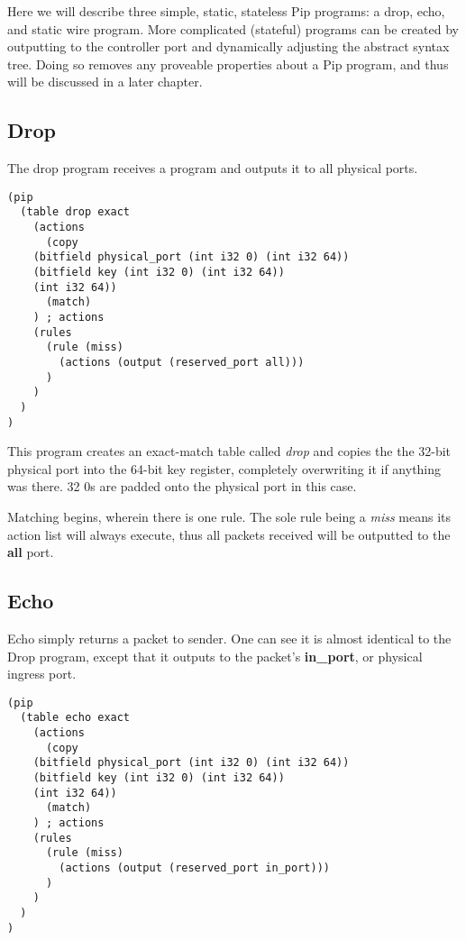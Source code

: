 
Here we will describe three simple, static, stateless Pip programs: a drop, echo, and static wire program. More complicated (stateful) programs can be created by outputting to the controller port and dynamically adjusting the abstract syntax tree. Doing so removes any proveable properties about a Pip program, and thus will be discussed in a later chapter.

\subsection{Drop}
The drop program receives a program and outputs it to all physical ports.
\begin{verbatim}
(pip
  (table drop exact
    (actions
      (copy
	(bitfield physical_port (int i32 0) (int i32 64))
	(bitfield key (int i32 0) (int i32 64))
	(int i32 64))
      (match)
    ) ; actions
    (rules
      (rule (miss)
        (actions (output (reserved_port all)))
      )
    )
  )
)
\end{verbatim}
This program creates an exact-match table called \textit{drop} and copies the the 32-bit physical port into the 64-bit key register, completely overwriting it if anything was there. 32 0s are padded onto the physical port in this case.

Matching begins, wherein there is one rule. The sole rule being a \textit{miss} means its action list will always execute, thus all packets received will be outputted to the \textbf{all} port.
\subsection{Echo}
Echo simply returns a packet to sender. One can see it is almost identical to the Drop program, except that it outputs to the packet's \textbf{in\_port}, or physical ingress port.
\begin{verbatim}
(pip
  (table echo exact
    (actions
      (copy
	(bitfield physical_port (int i32 0) (int i32 64))
	(bitfield key (int i32 0) (int i32 64))
	(int i32 64))
      (match)
    ) ; actions
    (rules
      (rule (miss)
        (actions (output (reserved_port in_port)))
      )
    )
  )
)
\end{verbatim}

